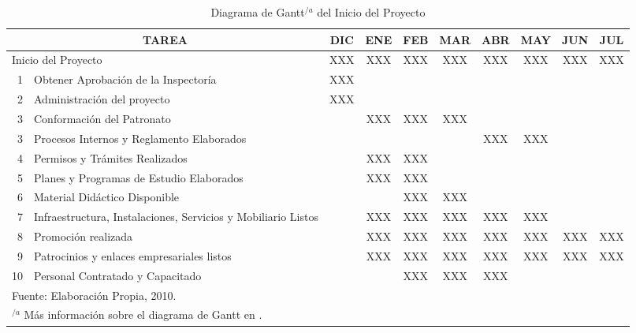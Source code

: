 \begin{table}
    \centering
    \caption{Diagrama de Gantt$^{/a}$ del Inicio del Proyecto}
    \label{tbl:Proy:Gantt}
    \footnotesize
    \begin{tabular}{r|p{6cm}|c|c|c|c|c|c|c|c}
        \multicolumn{2}{c|}{TAREA}                                         & DIC & ENE & FEB & MAR & ABR & MAY & JUN & JUL \\
        \hline
        \hline
        \multicolumn{2}{l|}{Inicio del Proyecto}                           & XXX & XXX & XXX & XXX & XXX & XXX & XXX & XXX \\
        \hline
        1  & Obtener Aprobación de la Inspectoría                          & XXX &     &     &     &     &     &     &     \\
        2  & Administración del proyecto                                   & XXX &     &     &     &     &     &     &     \\
        3  & Conformación del Patronato                                    &     & XXX & XXX & XXX &     &     &     &     \\
        3  & Procesos Internos y Reglamento Elaborados                     &     &     &     &     & XXX & XXX &     &     \\
        4  & Permisos y Trámites Realizados                                &     & XXX & XXX &     &     &     &     &     \\
        5  & Planes y Programas de Estudio Elaborados                      &     & XXX & XXX &     &     &     &     &     \\
        6  & Material Didáctico Disponible                                 &     &     & XXX & XXX &     &     &     &     \\
        7  & Infraestructura, Instalaciones, Servicios y Mobiliario Listos &     & XXX & XXX & XXX & XXX & XXX &     &     \\
        8  & Promoción realizada                                           &     & XXX & XXX & XXX & XXX & XXX & XXX & XXX \\
        9  & Patrocinios y enlaces empresariales listos                    &     & XXX & XXX & XXX & XXX & XXX & XXX & XXX \\
        10 & Personal Contratado y Capacitado                              &     &     & XXX & XXX & XXX &     &     &     \\
        \hline
        \multicolumn{10}{l}{\footnotesize Fuente: Elaboración Propia, 2010.} \\
        \multicolumn{10}{l}{$^{/a}$ \footnotesize Más información sobre el diagrama de Gantt en \citep{PMBOK2008}.}
    \end{tabular}
\end{table}

